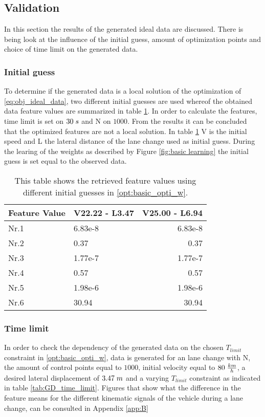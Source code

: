 \subsection{Validation} \label{s:GD_val}
In this section the results of the generated ideal data are discussed. There is being look at the influence of the initial guess, amount of optimization points and choice of time limit on the generated data.
\subsubsection{Initial guess}

To determine if the generated data is a local solution of the optimization of \ref{eq:obj_ideal_data}, two different initial guesses are used whereof the obtained data feature values are summarized in table \ref{tab:GD_local_test}. In order to calculate the features, time limit is set on $30\hspace{1mm}s$ and N on $1000$. From the results it can be concluded that the optimized features are not a local solution. In table \ref{tab:GD_local_test}  V is the initial speed and L the lateral distance of the lane change used as initial guess. During the learing of the weights as described by Figure \ref{fig:basic learning} the initial guess is set equal to the observed data. 

\begin{table}[h!]
	\centering
	\begin{tabular}{@{}llr@{}} \toprule
		Feature Value    & V22.22 - L3.47 & V25.00 - L6.94\\ \midrule
		Nr.1       & 6.83e-8   & 6.83e-8 \\
		Nr.2       & 0.37        & 0.37  \\
		Nr.3       & 1.77e-7     & 1.77e-7 \\
		Nr.4       & 0.57    & 0.57  \\
		Nr.5       & 1.98e-6     & 1.98e-6 \\
		Nr.6       & 30.94      & 30.94\\ \bottomrule
	\end{tabular}
	\caption{This table shows the retrieved feature values using different initial guesses in \ref{opt:basic_opti_w}.}
	\label{tab:GD_local_test}
\end{table}

\subsubsection{Time limit}
In order to check the dependency of the generated data on the chosen $T_{limit}$ constraint in \ref{opt:basic_opti_w}, data is generated for an lane change with N, the amount of control points equal to $1000$, initial velocity equal to $80 \hspace{1 mm} \frac{km}{h}$, a desired lateral displacement of $3.47\hspace{1mm}m$ and a varying $T_{limit}$ constraint as indicated in table \ref{tab:GD_time_limit}. Figures that  show what the difference in the feature means for the different kinematic signals of the vehicle during a lane change, can be consulted in Appendix \ref{app:B}

